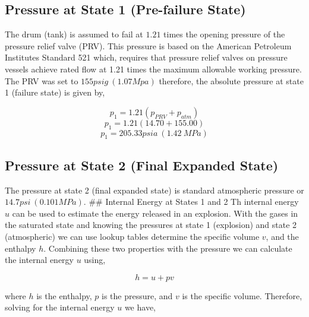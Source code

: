 \documentclass[10pt,parskip=half,
toc=sectionentrywithdots,
bibliography=totocnumbered,
captions=tableheading,numbers=noendperiod]{scrartcl}
\begin{document}
\hypertarget{pressure-at-state-1-pre-failure-state}{%
\subsection{Pressure at State 1 (Pre-failure
State)}\label{pressure-at-state-1-pre-failure-state}}

The drum (tank) is assumed to fail at \(1.21\) times the opening
pressure of the pressure relief valve (PRV)\cite{Engineers2013}. This
pressure is based on the American Petroleum Institutes Standard 521
which, requires that pressure relief valves on pressure vessels achieve
rated flow at 1.21 times the maximum allowable working pressure. The PRV
was set to \(155psig\:(1.07Mpa)\) therefore, the absolute pressure at
state 1 (failure state) is given by,

\begin{equation}p_1 = 1.21\left(p_{PRV}+p_{atm}\right)\end{equation}
\begin{equation}p_1 = 1.21\left(14.70+155.00\right)\end{equation}
\begin{equation}p_1 = 205.33 psia\:(1.42\:MPa)\end{equation}

\hypertarget{pressure-at-state-2-final-expanded-state}{%
\subsection{Pressure at State 2 (Final Expanded
State)}\label{pressure-at-state-2-final-expanded-state}}

The pressure at state 2 (final expanded state) is standard atmospheric
pressure or \(14.7psi\:(0.101MPa)\). \#\# Internal Energy at States 1
and 2 Th internal energy \(u\) can be used to estimate the energy
released in an explosion. With the gases in the saturated state and
knowing the pressures at state 1 (explosion) and state 2 (atmospheric)
we can use lookup tables determine the specific volume \(v\), and the
enthalpy \(h\). Combining these two properties with the pressure we can
calculate the internal energy \(u\) using,

\begin{equation}h = u + pv\end{equation}

where \(h\) is the enthalpy, \(p\) is the pressure, and \(v\) is the
specific volume. Therefore, solving for the internal energy \(u\) we
have,
\end{document}
